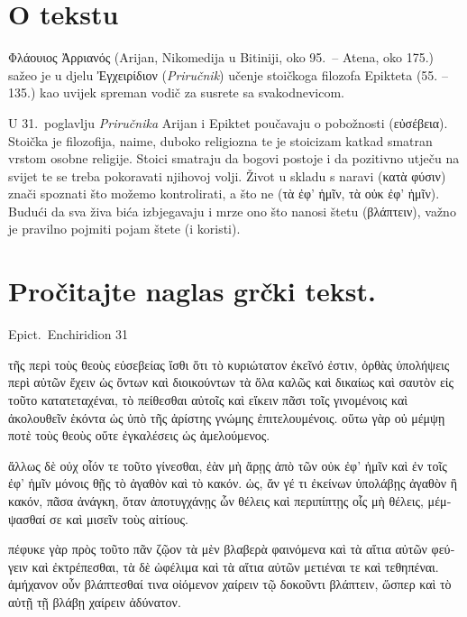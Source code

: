 
\section*{O tekstu}

\textgreek[variant=ancient]{Φλάουιος Ἀρριανός} (Arijan, Nikomedija u Bitiniji, oko 95.\ – Atena, oko 175.) sažeo je u djelu \textgreek[variant=ancient]{Ἐγχειρίδιον} (\textit{Priručnik}) učenje stoičkoga filozofa Epikteta (55. – 135.) kao uvijek spreman vodič za susrete sa svakodnevicom.

U 31.\ poglavlju \textit{Priručnika} Arijan i Epiktet poučavaju o pobožnosti \textgreek[variant=ancient]{(εὐσέβεια).} Stoička je filozofija, naime, duboko religiozna te je stoicizam katkad smatran vrstom osobne religije. Stoici smatraju da bogovi postoje i da pozitivno utječu na svijet te se treba pokoravati njihovoj volji. Život u skladu s naravi \textgreek[variant=ancient]{(κατὰ φύσιν)} znači spoznati što možemo kontrolirati, a što ne \textgreek[variant=ancient]{(τὰ ἐφ' ἡμῖν, τὰ οὐκ ἐφ' ἡμῖν).} Budući da sva živa bića izbjegavaju i mrze ono što nanosi štetu \textgreek[variant=ancient]{(βλάπτειν),} važno je pravilno pojmiti pojam štete (i koristi).


\section*{Pročitajte naglas grčki tekst.}

Epict.\ Enchiridion 31


\medskip


{\large

\begin{greek}

\noindent τῆς περὶ τοὺς θεοὺς εὐσεβείας ἴσθι ὅτι τὸ κυριώτατον ἐκεῖνό ἐστιν, ὀρθὰς ὑπολήψεις περὶ αὐτῶν ἔχειν ὡς ὄντων καὶ διοικούντων τὰ ὅλα καλῶς καὶ δικαίως καὶ σαυτὸν εἰς τοῦτο κατατεταχέναι, τὸ πείθεσθαι αὐτοῖς καὶ εἴκειν πᾶσι τοῖς γινομένοις καὶ ἀκολουθεῖν ἑκόντα ὡς ὑπὸ τῆς ἀρίστης γνώμης ἐπιτελουμένοις. οὕτω γὰρ οὐ μέμψῃ ποτὲ τοὺς θεοὺς οὔτε ἐγκαλέσεις ὡς ἀμελούμενος.

\noindent ἄλλως δὲ οὐχ οἷόν τε τοῦτο γίνεσθαι, ἐὰν μὴ ἄρῃς ἀπὸ τῶν οὐκ ἐφ' ἡμῖν καὶ ἐν τοῖς ἐφ' ἡμῖν μόνοις θῇς τὸ ἀγαθὸν καὶ τὸ κακόν. ὡς, ἄν γέ τι ἐκείνων ὑπολάβῃς ἀγαθὸν ἢ κακόν, πᾶσα ἀνάγκη, ὅταν ἀποτυγχάνῃς ὧν θέλεις καὶ περιπίπτῃς οἷς μὴ θέλεις, μέμψασθαί σε καὶ μισεῖν τοὺς αἰτίους.

\noindent πέφυκε γὰρ πρὸς τοῦτο πᾶν ζῷον τὰ μὲν βλαβερὰ φαινόμενα καὶ τὰ αἴτια αὐτῶν φεύγειν καὶ ἐκτρέπεσθαι, τὰ δὲ ὠφέλιμα καὶ τὰ αἴτια αὐτῶν μετιέναι τε καὶ τεθηπέναι. ἀμήχανον οὖν βλάπτεσθαί τινα οἰόμενον χαίρειν τῷ δοκοῦντι βλάπτειν, ὥσπερ καὶ τὸ αὐτῇ τῇ βλάβῃ χαίρειν ἀδύνατον.

\end{greek}

}


